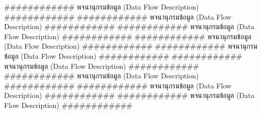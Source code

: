 ############ พจนานุกรมข้อมูล (Data Flow Description) ############
############ พจนานุกรมข้อมูล (Data Flow Description) ############
############ พจนานุกรมข้อมูล (Data Flow Description) ############
############ พจนานุกรมข้อมูล (Data Flow Description) ############
############ พจนานุกรมข้อมูล (Data Flow Description) ############
############ พจนานุกรมข้อมูล (Data Flow Description) ############
############ พจนานุกรมข้อมูล (Data Flow Description) ############
############ พจนานุกรมข้อมูล (Data Flow Description) ############
############ พจนานุกรมข้อมูล (Data Flow Description) ############

